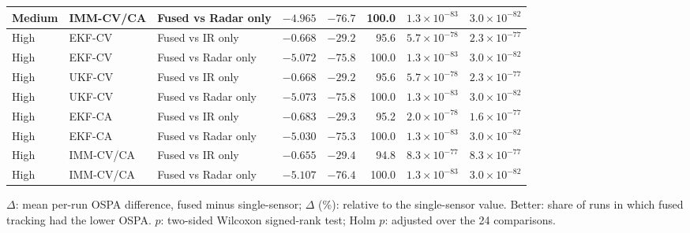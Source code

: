 \begin{table}[!htbp]
\begin{tabular}{@{}lllrrrrr@{}}
Medium & IMM-CV/CA & Fused vs Radar only & $-4.965$ & $-76.7$ & 100.0 & $1.3\times10^{-83}$ & $3.0\times10^{-82}$ \\
\midrule
High & EKF-CV & Fused vs IR only & $-0.668$ & $-29.2$ & 95.6 & $5.7\times10^{-78}$ & $2.3\times10^{-77}$ \\
High & EKF-CV & Fused vs Radar only & $-5.072$ & $-75.8$ & 100.0 & $1.3\times10^{-83}$ & $3.0\times10^{-82}$ \\
High & UKF-CV & Fused vs IR only & $-0.668$ & $-29.2$ & 95.6 & $5.7\times10^{-78}$ & $2.3\times10^{-77}$ \\
High & UKF-CV & Fused vs Radar only & $-5.073$ & $-75.8$ & 100.0 & $1.3\times10^{-83}$ & $3.0\times10^{-82}$ \\
High & EKF-CA & Fused vs IR only & $-0.683$ & $-29.3$ & 95.2 & $2.0\times10^{-78}$ & $1.6\times10^{-77}$ \\
High & EKF-CA & Fused vs Radar only & $-5.030$ & $-75.3$ & 100.0 & $1.3\times10^{-83}$ & $3.0\times10^{-82}$ \\
High & IMM-CV/CA & Fused vs IR only & $-0.655$ & $-29.4$ & 94.8 & $8.3\times10^{-77}$ & $8.3\times10^{-77}$ \\
High & IMM-CV/CA & Fused vs Radar only & $-5.107$ & $-76.4$ & 100.0 & $1.3\times10^{-83}$ & $3.0\times10^{-82}$ \\
\bottomrule
\end{tabular}

\smallskip
\parbox{\textwidth}{\footnotesize $\Delta$: mean per-run OSPA difference, fused minus single-sensor; $\Delta$ (\%): relative to the single-sensor value. Better: share of runs in which fused tracking had the lower OSPA. $p$: two-sided Wilcoxon signed-rank test; Holm $p$: adjusted over the 24 comparisons.}
\end{table}
